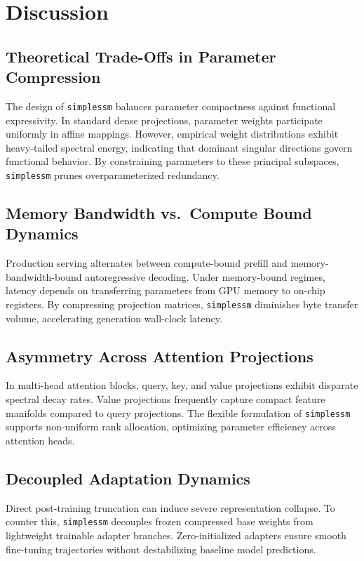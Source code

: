 \section{Discussion}

\subsection{Theoretical Trade-Offs in Parameter Compression}
The design of \texttt{simplessm} balances parameter compactness against functional expressivity. In standard dense projections, parameter weights participate uniformly in affine mappings. However, empirical weight distributions exhibit heavy-tailed spectral energy, indicating that dominant singular directions govern functional behavior. By constraining parameters to these principal subspaces, \texttt{simplessm} prunes overparameterized redundancy.

\subsection{Memory Bandwidth vs.\ Compute Bound Dynamics}
Production serving alternates between compute-bound prefill and memory-bandwidth-bound autoregressive decoding. Under memory-bound regimes, latency depends on transferring parameters from GPU memory to on-chip registers. By compressing projection matrices, \texttt{simplessm} diminishes byte transfer volume, accelerating generation wall-clock latency.

\subsection{Asymmetry Across Attention Projections}
In multi-head attention blocks, query, key, and value projections exhibit disparate spectral decay rates. Value projections frequently capture compact feature manifolds compared to query projections. The flexible formulation of \texttt{simplessm} supports non-uniform rank allocation, optimizing parameter efficiency across attention heads.

\subsection{Decoupled Adaptation Dynamics}
Direct post-training truncation can induce severe representation collapse. To counter this, \texttt{simplessm} decouples frozen compressed base weights from lightweight trainable adapter branches. Zero-initialized adapters ensure smooth fine-tuning trajectories without destabilizing baseline model predictions.

